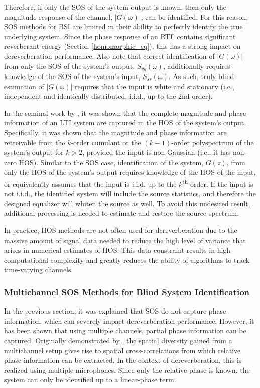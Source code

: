 \noindent
Therefore, if only the SOS of the system output is known, then only the magnitude response of the channel, $|G(\omega)|$, can be identified. For this reason, SOS methods for BSI are limited in their ability to perfectly identify the true underlying system. Since the phase response of an RTF contains significant reverberant energy (Section \ref{homomorphic_eq}), this has a strong impact on dereverberation performance. Also note that correct identification of $|G(\omega)|$ from only the SOS of the system's output, $S_{yy}(\omega)$, additionally requires knowledge of the SOS of the system's input, $S_{ss}(\omega)$. As such, truly blind estimation of $|G(\omega)|$ requires that the input is white and stationary (i.e., independent and identically distributed, i.i.d., up to the 2nd order).

In the seminal work by \cite{giannakis1989identification}, it was shown that the complete magnitude and phase information of an LTI system are captured in the HOS of the system's output. Specifically, it was shown that the magnitude and phase information are retreivable from the $k$-order cumulant or the $(k-1)$-order polyspectrum of the system's output for $k>2$, provided the input is non-Gaussian (i.e., it has non-zero HOS). Similar to the SOS case, identification of the system, $G(z)$, from only the HOS of the system's output requires knowledge of the HOS of the input, or equivalently assumes that the input is i.i.d. up to the $k$\textsuperscript{th} order. If the input is not i.i.d., the identified system will include the source statistics, and therefore the designed equalizer will whiten the source as well. To avoid this undesired result, additional processing is needed to estimate and restore the source spectrum.

In practice, HOS methods are not often used for dereverberation due to the massive amount of signal data needed to reduce the high level of variance that arises in numerical estimates of HOS. This data constraint results in high computational complexity and greatly reduces the ability of algorithms to track time-varying channels.
	
\subsubsection{Multichannel SOS Methods for Blind System Identification} \label{mc_sos_bsi}

In the previous section, it was explained that SOS do not capture phase information, which can severely impact dereverberation performance. However, it has been shown that using multiple channels, partial phase information can be captured. Originally demonstrated by \cite{slock1994blind}, the spatial diversity gained from a multichannel setup gives rise to spatial cross-correlations from which relative phase information can be extracted. In the context of dereverberation, this is realized using multiple microphones. Since only the relative phase is known, the system can only be identified up to a linear-phase term.

